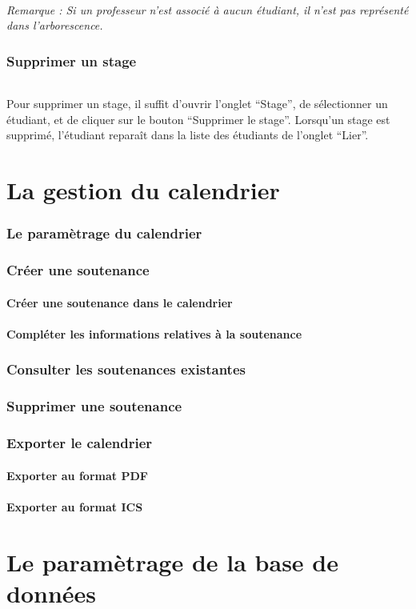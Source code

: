 \documentclass[a4paper,10pt]{book}
\begin{document}
	\paragraph{}
	  \textit{Remarque : Si un professeur n'est associé à aucun étudiant, il n'est pas représenté dans l'arborescence.}
      
    \section{Supprimer un stage}
      \paragraph{}
	Pour supprimer un stage, il suffit d'ouvrir l'onglet ``Stage'', de sélectionner un étudiant, et de cliquer sur le bouton ``Supprimer le stage''.
	Lorsqu'un stage est supprimé, l'étudiant reparaît dans la liste des étudiants de l'onglet ``Lier''.
    
    
\part{La gestion du calendrier}
    \section{Le paramètrage du calendrier}
      
    \section{Créer une soutenance}
      \subsection{Créer une soutenance dans le calendrier}
      \subsection{Compléter les informations relatives à la soutenance}
    \section{Consulter les soutenances existantes}
    \section{Supprimer une soutenance}
    \section{Exporter le calendrier}
      \subsection{Exporter au format PDF}
      \subsection{Exporter au format ICS}
\part{Le paramètrage de la base de données}
\end{document}

